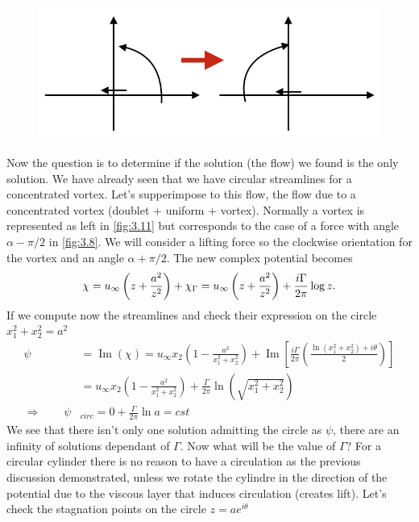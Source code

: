 	\begin{figure}
	\vspace{-5mm}	
	\includegraphics[scale=0.45]{ch3/11}	
	\label{fig:3.11}
	\end{figure}
	Now the question is to determine if the solution (the flow) we found is the only solution. We have already seen that we have circular streamlines for a concentrated vortex. Let's supperimpose to this flow, the flow due to a concentrated vortex (doublet + uniform + vortex). Normally a vortex is represented as left in \autoref{fig:3.11} but corresponds to the case of a force with angle $\alpha -\pi /2$ in \autoref{fig:3.8}. We will consider a lifting force so the clockwise orientation for the vortex and an angle $\alpha + \pi /2$. The new complex potential becomes 
	\begin{equation}
		\chi = u_\infty \left( z+\frac{a^2}{z^2} \right) + \chi _\Gamma = u_\infty \left( z+\frac{a^2}{z^2} \right) + \frac{i\Gamma}{2\pi}\log z .
	\end{equation}
	If we compute now the streamlines and check their expression on the circle $x_1^2 + x_2^2=a^2$
	\begin{equation}
	\begin{aligned}
	\psi &= \operatorname{Im}(\chi) = u_\infty  x_2 \left( 1 - \frac{a^2}{x_1^2 + x_2^2} \right)+ \operatorname{Im} \left[ \frac{i \Gamma}{2 \pi} \left( \frac{\ln (x_1^2 + x_2^2) + i\theta }{2} \right) \right]\\
 &=u_\infty  x_2 \left( 1 - \frac{a^2}{x_1^2 + x_2^2} \right)+ \frac{\Gamma}{2 \pi}\ln \left(\sqrt{x_1^2 + x_2^2}\right)\\
 \Rightarrow \qquad \psi &_{circ} = 0 + \frac{\Gamma}{2\pi}\ln a = cst 
	\end{aligned}
	\end{equation}
	We see that there isn't only one solution admitting the circle as $\psi$, there are an infinity of solutions dependant of $\Gamma$. Now what will be the value of $\Gamma$? For a circular cylinder there is no reason to have a circulation as the previous discussion demonstrated, unless we rotate the cylindre in the direction of the potential due to the viscous layer that induces circulation (creates lift). Let's check the stagnation points on the circle $z = ae^{i\theta}$

